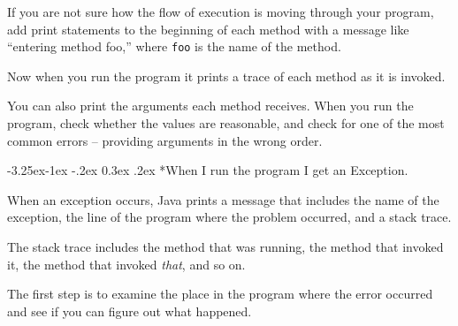\documentclass[12pt]{book}
\makeatletter
\theoremstyle{exercise}
\renewcommand\subsection{\@startsection{subsection}{2}{\z@}%
    {-3.25ex\@plus -1ex \@minus -.2ex}%
    {0.3ex \@plus .2ex}%
    {\normalfont\large\bfseries}}
\makeatother
\begin{document}
If you are not sure how the flow of execution is moving through your program, add print statements to the beginning of each method with a message like ``entering method foo,'' where {\tt foo} is the name of the method.

Now when you run the program it prints a trace of each method as it is invoked.

You can also print the arguments each method receives.
When you run the program, check whether the values are reasonable, and check
for one of the most common errors -- providing arguments in the wrong
order.


\subsection*{When I run the program I get an Exception.}

When an exception occurs, Java prints a message that includes the name of the
exception, the line of the program where the problem occurred, and a
stack trace.

The stack trace includes the method that was running, the method that invoked it, the method that invoked {\em that}, and so on.

The first step is to examine the place in the program where the error occurred and see if you can figure out what happened.
\end{document}
